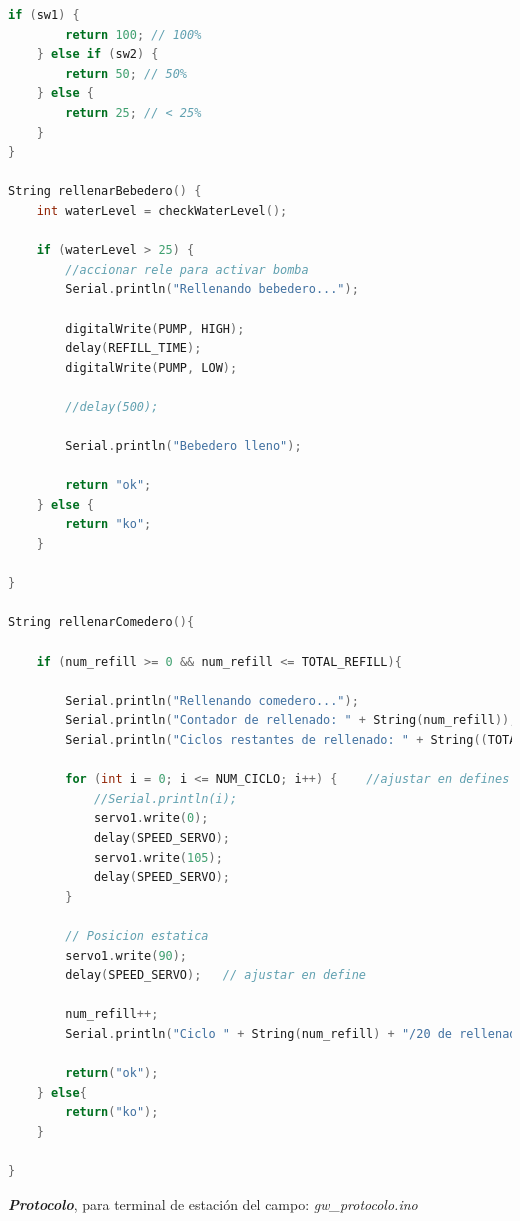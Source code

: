 \documentclass[12pt]{article}
\begin{document}
\begin{lstlisting}[language=C]
	if (sw1) {
		return 100; // 100%
	} else if (sw2) {
		return 50; // 50%
	} else {
		return 25; // < 25%
	}
}

String rellenarBebedero() {
	int waterLevel = checkWaterLevel();
	
	if (waterLevel > 25) {
		//accionar rele para activar bomba
		Serial.println("Rellenando bebedero...");
		
		digitalWrite(PUMP, HIGH);
		delay(REFILL_TIME);
		digitalWrite(PUMP, LOW);
		
		//delay(500);
		
		Serial.println("Bebedero lleno");
		
		return "ok";
	} else {
		return "ko";
	}
	
}

String rellenarComedero(){
	
	if (num_refill >= 0 && num_refill <= TOTAL_REFILL){
		
		Serial.println("Rellenando comedero...");
		Serial.println("Contador de rellenado: " + String(num_refill));
		Serial.println("Ciclos restantes de rellenado: " + String((TOTAL_REFILL-num_refill)));
		
		for (int i = 0; i <= NUM_CICLO; i++) {    //ajustar en defines NUM_CICLO si queremos un ciclo de rellenado mas largo o mas corto
			//Serial.println(i);
			servo1.write(0);
			delay(SPEED_SERVO);
			servo1.write(105);
			delay(SPEED_SERVO);
		}
		
		// Posicion estatica
		servo1.write(90);
		delay(SPEED_SERVO);   // ajustar en define
		
		num_refill++;
		Serial.println("Ciclo " + String(num_refill) + "/20 de rellenado finalizado.");
		
		return("ok");
	} else{
		return("ko");
	}
	
}
	\end{lstlisting}
	
	\pagebreak
	
	\noindent \textit{\textbf{Protocolo}}, para terminal de estación del campo: \textit{gw\_protocolo.ino} \\
	
\end{document}
